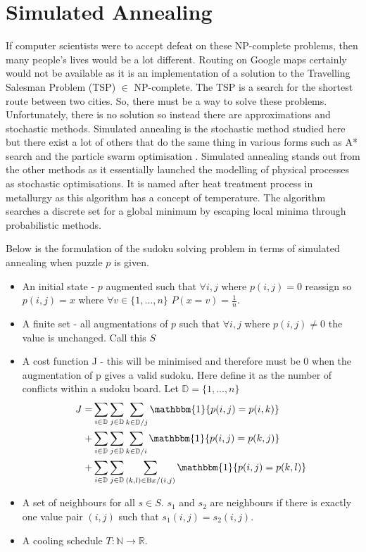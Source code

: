 \documentclass[a4paper,11pt]{report}
\newcounter{row}
\begin{document}
\section{Simulated Annealing} 

If computer scientists were to accept defeat on these NP-complete problems, then many people’s lives would be a lot different. Routing on Google maps certainly would not be available as it is an implementation of a solution to the Travelling Salesman Problem (TSP) $\in$ NP-complete\cite{Applegate2006}. The TSP is a search for the shortest route between two cities. So, there must be a way to solve these problems. Unfortunately, there is no solution so instead there are approximations and stochastic methods. Simulated annealing is the stochastic method studied here but there exist a lot of others that do the same thing in various forms such as A* search \cite{hart1968formal} and the particle swarm optimisation \cite{eberhart1995new}. Simulated annealing stands out from the other methods as it essentially launched the modelling of physical processes as stochastic optimisations. It is named after heat treatment process in metallurgy as this algorithm has a concept of temperature. The algorithm searches a discrete set for a global minimum by escaping local minima through probabilistic methods.

Below is the formulation of the sudoku solving problem in terms of simulated annealing when puzzle $p$ is given.
\begin{itemize}
\item An initial state - $p$ augmented such that $\forall i,j$ where $p(i,j)=0$ reassign so $p(i,j)=x$ where $\forall v \in \{1,...,n\}$ $P(x=v)=\frac{1}{n}$.
\item A finite set - all augmentations of $p$ such that $\forall i,j$ where $p(i,j)\neq0$ the value is unchanged. Call this $S$
\item A cost function J - this will be minimised and therefore must be 0 when the augmentation of p gives a valid sudoku. Here define it as the number of conflicts within a sudoku board. Let $\mathbb{D}=\{1,...,n\}$
\begin{eqnarray}J=&\sum_{i\in\mathbb{D}}\sum_{j\in\mathbb{D}}\sum_{k\in\mathbb{D}/j} \mathbbm{1}\{p(i,j)=p(i,k)\}\\+&\sum_{i\in\mathbb{D}}\sum_{j\in\mathbb{D}}\sum_{k\in\mathbb{D}/i} \mathbbm{1}\{p(i,j)=p(k,j)\}\\+&\sum_{i\in\mathbb{D}}\sum_{j\in\mathbb{D}}\sum_{(k,l)\in\text{B}x/(i,j)} \mathbbm{1}\{p(i,j)=p(k,l)\}\end{eqnarray}
\item A set of neighbours for all $s\in S$. $s_1$ and $s_2$ are neighbours if there is exactly one value pair $(i,j)$ such that $s_1(i,j)=s_2(i,j)$.
\item A cooling schedule $T:\mathbb{N}\rightarrow\mathbb{R}$.
\end{itemize}
\end{document}
